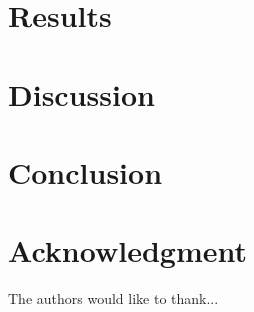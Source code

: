 \documentclass[10pt,twocolumn]{article}
\begin{document}



\section{Results}
\label{sec:results}



\section{Discussion}
\label{sec:discussion}





\section{Conclusion}

\label{sec:conclusion}




\section*{Acknowledgment}


The authors would like to thank...


\printbibliography 
\end{document}
